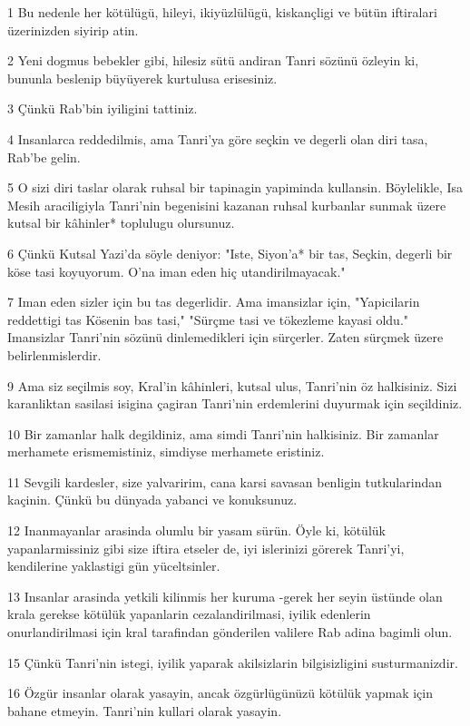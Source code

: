 \par 1 Bu nedenle her kötülügü, hileyi, ikiyüzlülügü, kiskançligi ve bütün iftiralari üzerinizden siyirip atin.
\par 2 Yeni dogmus bebekler gibi, hilesiz sütü andiran Tanri sözünü özleyin ki, bununla beslenip büyüyerek kurtulusa erisesiniz.
\par 3 Çünkü Rab'bin iyiligini tattiniz.
\par 4 Insanlarca reddedilmis, ama Tanri'ya göre seçkin ve degerli olan diri tasa, Rab'be gelin.
\par 5 O sizi diri taslar olarak ruhsal bir tapinagin yapiminda kullansin. Böylelikle, Isa Mesih araciligiyla Tanri'nin begenisini kazanan ruhsal kurbanlar sunmak üzere kutsal bir kâhinler* toplulugu olursunuz.
\par 6 Çünkü Kutsal Yazi'da söyle deniyor: "Iste, Siyon'a* bir tas, Seçkin, degerli bir köse tasi koyuyorum. O'na iman eden hiç utandirilmayacak."
\par 7 Iman eden sizler için bu tas degerlidir. Ama imansizlar için, "Yapicilarin reddettigi tas Kösenin bas tasi," "Sürçme tasi ve tökezleme kayasi oldu." Imansizlar Tanri'nin sözünü dinlemedikleri için sürçerler. Zaten sürçmek üzere belirlenmislerdir.
\par 9 Ama siz seçilmis soy, Kral'in kâhinleri, kutsal ulus, Tanri'nin öz halkisiniz. Sizi karanliktan sasilasi isigina çagiran Tanri'nin erdemlerini duyurmak için seçildiniz.
\par 10 Bir zamanlar halk degildiniz, ama simdi Tanri'nin halkisiniz. Bir zamanlar merhamete erismemistiniz, simdiyse merhamete eristiniz.
\par 11 Sevgili kardesler, size yalvaririm, cana karsi savasan benligin tutkularindan kaçinin. Çünkü bu dünyada yabanci ve konuksunuz.
\par 12 Inanmayanlar arasinda olumlu bir yasam sürün. Öyle ki, kötülük yapanlarmissiniz gibi size iftira etseler de, iyi islerinizi görerek Tanri'yi, kendilerine yaklastigi gün yüceltsinler.
\par 13 Insanlar arasinda yetkili kilinmis her kuruma -gerek her seyin üstünde olan krala gerekse kötülük yapanlarin cezalandirilmasi, iyilik edenlerin onurlandirilmasi için kral tarafindan gönderilen valilere Rab adina bagimli olun.
\par 15 Çünkü Tanri'nin istegi, iyilik yaparak akilsizlarin bilgisizligini susturmanizdir.
\par 16 Özgür insanlar olarak yasayin, ancak özgürlügünüzü kötülük yapmak için bahane etmeyin. Tanri'nin kullari olarak yasayin.
